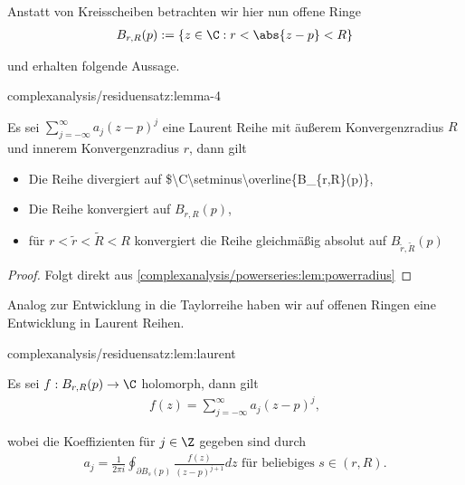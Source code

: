 \documentclass[letterpaper,10pt,german]{jupyterBook}
\begin{document}
\par
Anstatt von Kreisscheiben betrachten wir hier nun offene Ringe
\begin{align*}
B_{r,R}(p) := \{z\in \C: r< \abs{z-p} < R\}
\end{align*}
\par
und erhalten folgende Aussage.
\begin{lemma}{}{complexanalysis/residuensatz:lemma-4}



\par
Es sei \(\sum_{j=-\infty}^\infty a_j (z-p)^j\) eine Laurent Reihe mit äußerem Konvergenzradius \(R\) und innerem Konvergenzradius \(r\), dann gilt
\begin{itemize}
\item {} 
\par
Die Reihe divergiert auf \$\textbackslash{}C\textbackslash{}setminus\textbackslash{}overline\{B\_\{r,R\}(p)\},

\item {} 
\par
Die Reihe konvergiert auf \(B_{r,R}(p)\),

\item {} 
\par
für \(r<\tilde{r}<\tilde{R}< R\) konvergiert die Reihe gleichmäßig absolut auf \(B_{\tilde{r},\tilde{R}}(p)\)

\end{itemize}
\end{lemma}

\begin{proof}
 Folgt direkt aus \cref{complexanalysis/powerseries:lem:powerradius} \end{proof}

\par
Analog zur Entwicklung in die Taylorreihe haben wir auf offenen Ringen eine Entwicklung in Laurent Reihen.
\begin{lemma}{}{complexanalysis/residuensatz:lem:laurent}



\par
Es sei \(f:B_{r,R}(p)\to\C\) holomorph, dann gilt
\begin{align*}
f(z) = \sum_{j=-\infty}^\infty a_j (z-p)^j,
\end{align*}
\par
wobei die Koeffizienten für \(j\in\Z\) gegeben sind durch
\begin{align*}
a_j = \frac{1}{2\pi i} \oint_{\partial B_s(p)} \frac{f(z)}{(z-p)^{j+1}} dz \text{ für beliebiges } s\in (r,R).
\end{align*}\end{lemma}
\end{document}
